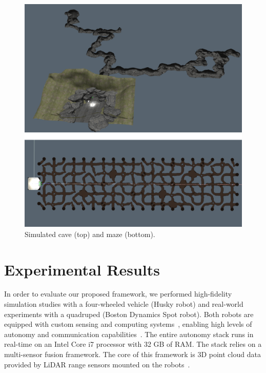 \documentclass[letterpaper]{article} %
\newcommand{\ph}[1]{{\textbf{#1}:}} %
\begin{document}
\begin{figure}
	\centering
	\includegraphics[width=0.63\columnwidth]{figures/together.png}
	\caption{Simulated cave (top) and maze (bottom).}
	\label{fig:maps_of_cave}
\end{figure}



\section{Experimental Results}\label{sec:exp_results}
In order to evaluate our proposed framework, we performed high-fidelity simulation studies with a four-wheeled vehicle (Husky robot) and real-world experiments with a quadruped (Boston Dynamics Spot robot). Both robots are equipped with custom sensing and computing systems~\cite{AutoSpot}, enabling high levels of autonomy and communication capabilities~\cite{Otsu2020}. The entire autonomy stack runs in real-time on an Intel Core i7 processor with 32 GB of RAM. The stack relies on a multi-sensor fusion framework. The core of this framework is 3D point cloud data provided by LiDAR range sensors mounted on the robots~\cite{Ebadi2020}.
\end{document}
